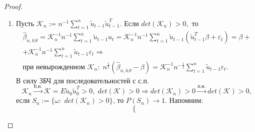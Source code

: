 \begin{proof}
\begin{enumerate}
            $$E\eta_t = E(\lambda^T \tilde{u}_{t - 1})E\varepsilon_t = 0, \; E|\eta|^{2 + \delta} = E|\lambda^T \tilde{u}_{t - 1}|^{2 + \delta}E|\varepsilon_t|^{2 + \delta} < \infty,$$
            т.к. по условию $E|\varepsilon_1|^{2 + \delta} < \infty$ (см. док-во теоремы \ref{lec:13/sec:2}), т.к.
            $$\lbrace E|\lambda^T \tilde{u}_{t - 1}|^{2 + \delta} \rbrace^{\frac{1}{2 + \delta}} \leq \sum\limits_{i = 1}^p |\lambda_i| \lbrace E|\tilde{u}_{1}|^{2 + \delta} \rbrace^{\frac{1}{2 + \delta}} < \infty$$
            в силу неравенства Миньковского. Кроме того, при $t < s$ 
            $$E\eta_t\eta_s = E\lbrace (\lambda^T \tilde{u}_{t - 1} \varepsilon_t) \times (\lambda^T \tilde{u}_{s - 1}) \rbrace \varepsilon_s = 0.$$
            Кроме того, $\sum\limits_{\tau \geq 1}(\alpha(\tau))^{\frac{2}{2 + \delta}} < \infty.$  силу ЦПТ для последовательностей с с.п.
            $$n^{\frac{1}{2}}\sum\limits_{t = 1}^n \eta_t \stackrel{d}{\to} N(0, E\eta_0^2), \; E\eta_0^2 = \sigma^2 \lambda^T \mathcal{K} \lambda.$$
            Соотношение (26) доказано $\Longrightarrow$
            $$\mathcal{K}^{-1} n^{-\frac{1}{2}} \sum\limits_{t = 1}^n \tilde{u}_{t - 1}\varepsilon_t \stackrel{d}{\to} N(0, \sigma^2 \mathcal{K}^{-1}). \eqno(27)$$ 
            \item Пусть $\mathcal{K}_n := n^{-1}\sum\limits_{t = 1}^n \tilde{u}_{t - 1} \tilde{u}_{t - 1}^T.$ Если $det(\mathcal{K}_n) > 0, $ то 
            $$\begin{gathered}
                \hat{\beta}_{n, hS} = \mathcal{K}_n^{-1} n^{-1}\sum\limits_{t = 1}^n \tilde{u}_{t - 1} u_t = \mathcal{K}_n^{-1} n^{-1}\sum\limits_{t = 1}^n \tilde{u}_{t - 1}(\tilde{u}_{t - 1}^T \beta + \varepsilon_t) = \beta +\\
                + \mathcal{K}_n^{-1} n^{-1}\sum\limits_{t = 1}^n \tilde{u}_{t - 1}\varepsilon_t \Longrightarrow \\
                \text{при невырожденном } \mathcal{K}_n: \; n^{\frac{1}{2}}(\hat{\beta}_{n, hS} - \beta) = \mathcal{K}_n^{-1} n^{-\frac{1}{2}}\sum\limits_{t = 1}^n \tilde{u}_{t - 1}\varepsilon_t.
            \end{gathered}$$
            В силу ЗБЧ для последовательностей с с.п.
            $$\mathcal{K}_n \stackrel{\text{п.н.}}{\to} \mathcal{K} = E\tilde{u}_{0}\tilde{u}_{0}^T > 0, \; det(\mathcal{K}) > 0 \Longrightarrow det(\mathcal{K}_n) > 0 \stackrel{\text{п.н.}}{\to} det(\mathcal{K}) > 0,$$
            если $S_n := \lbrace \omega: \; det(\mathcal{K}_n) > 0\rbrace$, то $P(S_n) \to 1.$
            Напомним:
            $$\begin{cases}

\end{cases}$$
\end{enumerate}
\end{proof}

